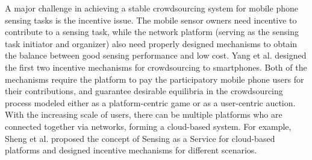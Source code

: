 \documentclass{IEEEtran}
\begin{document}
A major challenge in achieving a stable crowdsourcing system for mobile phone sensing tasks is the incentive issue. The mobile sensor owners need incentive to contribute to a sensing task, while the network platform (serving as the sensing task initiator and organizer) also need properly designed mechanisms to obtain the balance between good sensing performance and low cost. Yang et al. \cite{yang:crowdsourcing} designed the first two incentive mechanisms for crowdsourcing to smartphones. Both {\color{black}of} the mechanisms require the platform to pay the participatory mobile phone users for their contributions, and guarantee desirable equilibria in the crowdsourcing process modeled either as a platform-centric game or as a user-centric auction. %
With the increasing scale of users, there can be multiple platforms who are connected together via networks, forming a cloud-based system. For example, Sheng et al. \cite{sheng:s2aas} proposed the concept of Sensing as a Service for cloud-based platforms and designed incentive mechanisms for different scenarios. %




\end{document}
